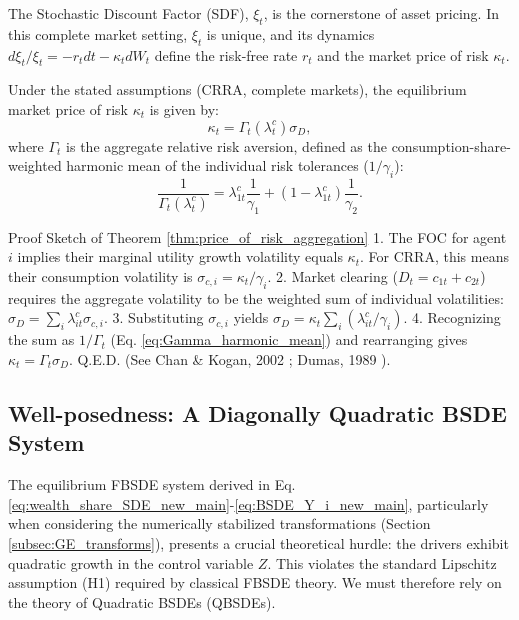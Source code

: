The Stochastic Discount Factor (SDF), $\xi_t$, is the cornerstone of asset pricing. In this complete market setting, $\xi_t$ is unique, and its dynamics $d\xi_t/\xi_t = -r_t dt - \kappa_t dW_t$ define the risk-free rate $r_t$ and the market price of risk $\kappa_t$.

\begin{theorem}
\label{thm:price_of_risk_aggregation}
Under the stated assumptions (CRRA, complete markets), the equilibrium market price of risk $\kappa_t$ is given by:
\begin{equation}\label{eq:kappa_aggregation}
    \kappa_t = \Gamma_t(\lambda^c_t) \sigma_D,
\end{equation}
where $\Gamma_t$ is the aggregate relative risk aversion, defined as the consumption-share-weighted harmonic mean of the individual risk tolerances ($1/\gamma_i$):
\begin{equation}\label{eq:Gamma_harmonic_mean}
    \frac{1}{\Gamma_t(\lambda^c_t)} = \lambda^c_{1t}\frac{1}{\gamma_1} + (1-\lambda^c_{1t})\frac{1}{\gamma_2}.
\end{equation}
\end{theorem}

\begin{leanproofbox}{Proof Sketch of Theorem \ref{thm:price_of_risk_aggregation}}
1. The FOC for agent $i$ implies their marginal utility growth volatility equals $\kappa_t$. For CRRA, this means their consumption volatility is $\sigma_{c,i} = \kappa_t/\gamma_i$.
2. Market clearing ($D_t = c_{1t}+c_{2t}$) requires the aggregate volatility to be the weighted sum of individual volatilities: $\sigma_D = \sum_i \lambda^c_{it} \sigma_{c,i}$.
3. Substituting $\sigma_{c,i}$ yields $\sigma_D = \kappa_t \sum_i (\lambda^c_{it}/\gamma_i)$.
4. Recognizing the sum as $1/\Gamma_t$ (Eq. \ref{eq:Gamma_harmonic_mean}) and rearranging gives $\kappa_t = \Gamma_t \sigma_D$. Q.E.D. (See Chan \& Kogan, 2002 \cite{ChanKogan2002}; Dumas, 1989 \cite{Dumas1989}).
\end{leanproofbox}

\subsection{Well-posedness: A Diagonally Quadratic BSDE System}
\label{subsubsec:GE_QBSDE_Wellposedness}

The equilibrium FBSDE system derived in Eq. \eqref{eq:wealth_share_SDE_new_main}-\eqref{eq:BSDE_Y_i_new_main}, particularly when considering the numerically stabilized transformations (Section \ref{subsec:GE_transforms}), presents a crucial theoretical hurdle: the drivers exhibit quadratic growth in the control variable $Z$. This violates the standard Lipschitz assumption (H1) required by classical FBSDE theory. We must therefore rely on the theory of Quadratic BSDEs (QBSDEs).

